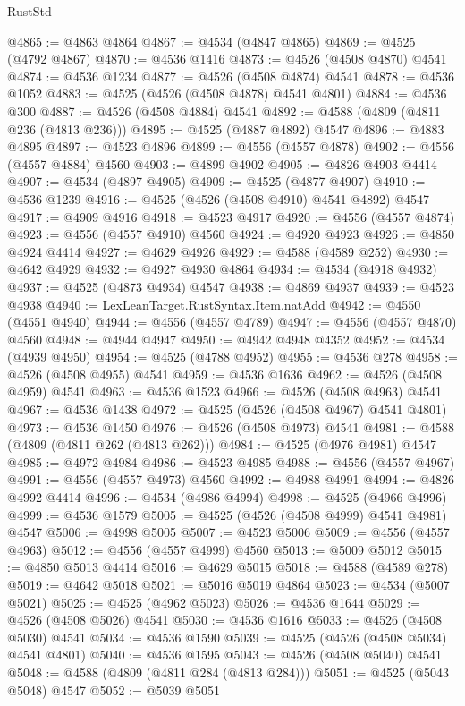 \begin{lexlean}{RustStd}
\begin{coremodule}
{\begin{coremodule}
{{{{{{{{{{{{{{{{{{{{{{{{{{{{{{{{{{{{{{{{{{{{{{{{{{{{{{{@4865 := @4863 @4864
@4867 := @4534 (@4847 @4865)
@4869 := @4525 (@4792 @4867)
@4870 := @4536 @1416
@4873 := @4526 (@4508 @4870) @4541
@4874 := @4536 @1234
@4877 := @4526 (@4508 @4874) @4541
@4878 := @4536 @1052
@4883 := @4525 (@4526 (@4508 @4878) @4541 @4801)
@4884 := @4536 @300
@4887 := @4526 (@4508 @4884) @4541
@4892 := @4588 (@4809 (@4811 @236 (@4813 @236)))
@4895 := @4525 (@4887 @4892) @4547
@4896 := @4883 @4895
@4897 := @4523 @4896
@4899 := @4556 (@4557 @4878)
@4902 := @4556 (@4557 @4884) @4560
@4903 := @4899 @4902
@4905 := @4826 @4903 @4414
@4907 := @4534 (@4897 @4905)
@4909 := @4525 (@4877 @4907)
@4910 := @4536 @1239
@4916 := @4525 (@4526 (@4508 @4910) @4541 @4892) @4547
@4917 := @4909 @4916
@4918 := @4523 @4917
@4920 := @4556 (@4557 @4874)
@4923 := @4556 (@4557 @4910) @4560
@4924 := @4920 @4923
@4926 := @4850 @4924 @4414
@4927 := @4629 @4926
@4929 := @4588 (@4589 @252)
@4930 := @4642 @4929
@4932 := @4927 @4930 @4864
@4934 := @4534 (@4918 @4932)
@4937 := @4525 (@4873 @4934) @4547
@4938 := @4869 @4937
@4939 := @4523 @4938
@4940 := LexLeanTarget.RustSyntax.Item.natAdd
@4942 := @4550 (@4551 @4940)
@4944 := @4556 (@4557 @4789)
@4947 := @4556 (@4557 @4870) @4560
@4948 := @4944 @4947
@4950 := @4942 @4948 @4352
@4952 := @4534 (@4939 @4950)
@4954 := @4525 (@4788 @4952)
@4955 := @4536 @278
@4958 := @4526 (@4508 @4955) @4541
@4959 := @4536 @1636
@4962 := @4526 (@4508 @4959) @4541
@4963 := @4536 @1523
@4966 := @4526 (@4508 @4963) @4541
@4967 := @4536 @1438
@4972 := @4525 (@4526 (@4508 @4967) @4541 @4801)
@4973 := @4536 @1450
@4976 := @4526 (@4508 @4973) @4541
@4981 := @4588 (@4809 (@4811 @262 (@4813 @262)))
@4984 := @4525 (@4976 @4981) @4547
@4985 := @4972 @4984
@4986 := @4523 @4985
@4988 := @4556 (@4557 @4967)
@4991 := @4556 (@4557 @4973) @4560
@4992 := @4988 @4991
@4994 := @4826 @4992 @4414
@4996 := @4534 (@4986 @4994)
@4998 := @4525 (@4966 @4996)
@4999 := @4536 @1579
@5005 := @4525 (@4526 (@4508 @4999) @4541 @4981) @4547
@5006 := @4998 @5005
@5007 := @4523 @5006
@5009 := @4556 (@4557 @4963)
@5012 := @4556 (@4557 @4999) @4560
@5013 := @5009 @5012
@5015 := @4850 @5013 @4414
@5016 := @4629 @5015
@5018 := @4588 (@4589 @278)
@5019 := @4642 @5018
@5021 := @5016 @5019 @4864
@5023 := @4534 (@5007 @5021)
@5025 := @4525 (@4962 @5023)
@5026 := @4536 @1644
@5029 := @4526 (@4508 @5026) @4541
@5030 := @4536 @1616
@5033 := @4526 (@4508 @5030) @4541
@5034 := @4536 @1590
@5039 := @4525 (@4526 (@4508 @5034) @4541 @4801)
@5040 := @4536 @1595
@5043 := @4526 (@4508 @5040) @4541
@5048 := @4588 (@4809 (@4811 @284 (@4813 @284)))
@5051 := @4525 (@5043 @5048) @4547
@5052 := @5039 @5051
}}}}}}}}}}}}}}}}}}}}}}}}}}}}}}}}}}}}}}}}}}}}}}}}}}}}}}}
\end{coremodule}}
\end{coremodule}
\end{lexlean}
